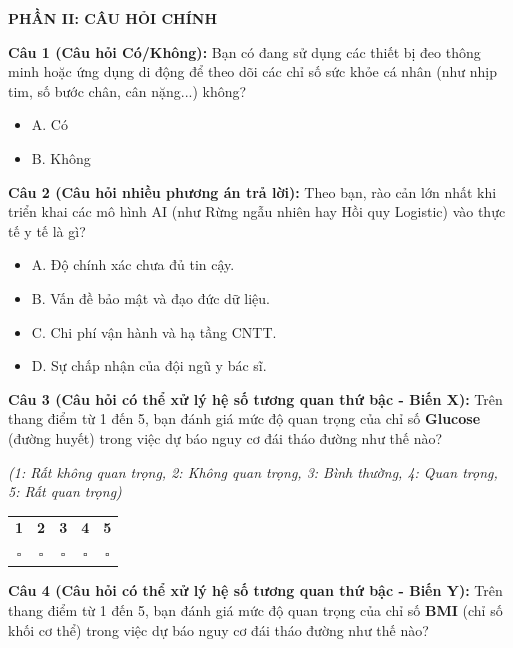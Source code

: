 \documentclass[14pt,a4paper]{extreport}
\begin{document}
\vspace{0.3cm}

\textbf{PHẦN II: CÂU HỎI CHÍNH}

\noindent\textbf{Câu 1 (Câu hỏi Có/Không):} Bạn có đang sử dụng các thiết bị đeo thông minh hoặc ứng dụng di động để theo dõi các chỉ số sức khỏe cá nhân (như nhịp tim, số bước chân, cân nặng...) không?
\begin{itemize}
  \item[$\square$] A. Có
  \item[$\square$] B. Không
\end{itemize}

\vspace{0.3cm}

\noindent\textbf{Câu 2 (Câu hỏi nhiều phương án trả lời):} Theo bạn, rào cản lớn nhất khi triển khai các mô hình AI (như Rừng ngẫu nhiên hay Hồi quy Logistic) vào thực tế y tế là gì?
\begin{itemize}
  \item[$\square$] A. Độ chính xác chưa đủ tin cậy.
  \item[$\square$] B. Vấn đề bảo mật và đạo đức dữ liệu.
  \item[$\square$] C. Chi phí vận hành và hạ tầng CNTT.
  \item[$\square$] D. Sự chấp nhận của đội ngũ y bác sĩ.
\end{itemize}

\vspace{0.3cm}

\noindent\textbf{Câu 3 (Câu hỏi có thể xử lý hệ số tương quan thứ bậc - Biến X):} Trên thang điểm từ 1 đến 5, bạn đánh giá mức độ quan trọng của chỉ số \textbf{Glucose} (đường huyết) trong việc dự báo nguy cơ đái tháo đường như thế nào?

\noindent\textit{(1: Rất không quan trọng, 2: Không quan trọng, 3: Bình thường, 4: Quan trọng, 5: Rất quan trọng)}

\begin{center}
\begin{tabular}{ccccc}
  \textbf{1} & \textbf{2} & \textbf{3} & \textbf{4} & \textbf{5} \\
  $\square$ & $\square$ & $\square$ & $\square$ & $\square$ \\
\end{tabular}
\end{center}

\vspace{0.3cm}

\noindent\textbf{Câu 4 (Câu hỏi có thể xử lý hệ số tương quan thứ bậc - Biến Y):} Trên thang điểm từ 1 đến 5, bạn đánh giá mức độ quan trọng của chỉ số \textbf{BMI} (chỉ số khối cơ thể) trong việc dự báo nguy cơ đái tháo đường như thế nào?
\end{document}
